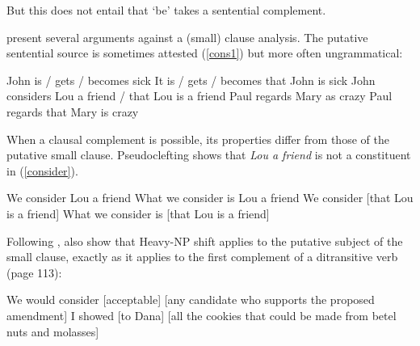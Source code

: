\documentclass[output=paper]{langsci/langscibook}
\begin{document}
But this does not entail that `be' takes a sentential complement. 




\citet[Ch.3]{PollardandSag1994} present several arguments against a (small) clause analysis. The putative sentential source is sometimes attested (\ref{cons1}) but more often ungrammatical:

	
\begin{exe}
\ex \begin{xlist}
\ex John is / gets / becomes sick
\ex *It is / gets / becomes that John is sick
\ex \label{cons1} John considers Lou a friend / that Lou is a friend 
\ex 	Paul regards Mary as crazy	
\ex *Paul regards that Mary is crazy
\end{xlist}	

\end{exe}

	
When a clausal complement is possible, its properties differ from those of the putative small clause. Pseudoclefting shows that \textit{Lou a friend} is not a constituent in (\ref{consider}).

\begin{exe}
\ex \begin{xlist}
\ex 	We consider Lou a friend	\label{consider}
\ex  *What we consider is Lou a friend
\ex We consider [that Lou is a friend]
\ex 	What we consider is [that Lou is a friend]
\end{xlist}

\end{exe}

Following \citet{Bresnan1982}, \citet[113]{PollardandSag1994} also show that Heavy-NP shift applies to the putative subject of the small clause, exactly as it applies to the first complement of a ditransitive verb (page 113):

\begin{exe}
\ex \begin{xlist}
\ex   We would consider [acceptable]  [any candidate who supports the proposed amendment]  
\ex   I showed [to Dana]  [all the cookies that could be made from betel nuts and molasses]  
\end{xlist}

\end{exe}
\end{document}
